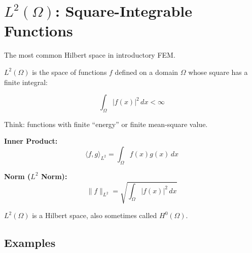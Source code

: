 \documentclass[
  11pt,
  a4paper,
]{scrbook}
\begin{document}
\section{\texorpdfstring{\(L^2(\Omega)\): Square-Integrable
Functions}{L\^{}2(\textbackslash Omega): Square-Integrable Functions}}\label{l2omega-square-integrable-functions}

The most common Hilbert space in introductory FEM.

\(L^2(\Omega)\) is the space of functions \(f\) defined on a domain
\(\Omega\) whose square has a finite integral:

\[\int_{\Omega} |f(x)|^2 \,dx < \infty\]

Think: functions with finite ``energy'' or finite mean-square value.

\textbf{Inner Product:}
\[\langle f, g\rangle_{L^2} = \int_{\Omega} f(x) g(x) \,dx\]

\textbf{Norm (\(L^2\) Norm):}
\[\|f\|_{L^2} = \sqrt{\int_{\Omega} |f(x)|^2 \,dx}\]

\(L^2(\Omega)\) is a Hilbert space, also sometimes called
\(H^0(\Omega)\).

\subsection{Examples}\label{examples}
\end{document}
